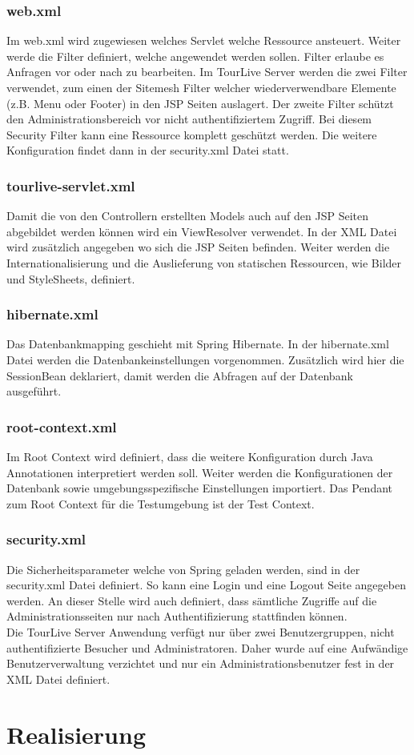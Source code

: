 \subsubsection{web.xml}
Im web.xml wird zugewiesen welches Servlet welche Ressource ansteuert. Weiter werde die Filter definiert, welche angewendet werden sollen. Filter erlaube es Anfragen vor oder nach zu bearbeiten. Im TourLive Server werden die zwei Filter verwendet, zum einen der Sitemesh Filter welcher wiederverwendbare Elemente (z.B. Menu oder Footer) in den JSP Seiten auslagert. Der zweite Filter schützt den Administrationsbereich vor nicht authentifiziertem Zugriff. Bei diesem Security Filter kann eine Ressource komplett geschützt werden. Die weitere Konfiguration findet dann in der security.xml Datei statt.

\subsubsection{tourlive-servlet.xml}
Damit die von den Controllern erstellten Models auch auf den JSP Seiten abgebildet werden können wird ein ViewResolver verwendet. In der XML Datei wird zusätzlich angegeben wo sich die JSP Seiten befinden. Weiter werden die Internationalisierung und die Auslieferung von statischen Ressourcen, wie Bilder und StyleSheets, definiert.

\subsubsection{hibernate.xml}
Das Datenbankmapping geschieht mit Spring Hibernate. In der hibernate.xml Datei werden die Datenbankeinstellungen vorgenommen. Zusätzlich wird hier die SessionBean deklariert, damit werden die Abfragen auf der Datenbank ausgeführt.

\subsubsection{root-context.xml}
Im Root Context wird definiert, dass die weitere Konfiguration durch Java Annotationen interpretiert werden soll. Weiter werden die Konfigurationen der Datenbank sowie umgebungsspezifische Einstellungen importiert. Das Pendant zum Root Context für die Testumgebung ist der Test Context.

\subsubsection{security.xml}
Die Sicherheitsparameter welche von Spring geladen werden, sind in der security.xml Datei definiert. So kann eine Login und eine Logout Seite angegeben werden. An dieser Stelle wird auch definiert, dass sämtliche Zugriffe auf die Administrationsseiten nur nach Authentifizierung stattfinden können.
\\

Die TourLive Server Anwendung verfügt nur über zwei Benutzergruppen, nicht authentifizierte Besucher und Administratoren. Daher wurde auf eine Aufwändige Benutzerverwaltung verzichtet und nur ein Administrationsbenutzer fest in der XML Datei definiert.

\section{Realisierung}


